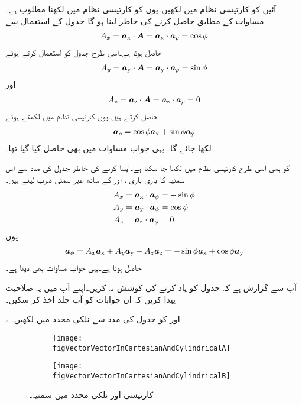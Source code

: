 آئیں  کو کارتیسی نظام میں لکھیں۔یوں  کو  کارتیسی نظام میں لکھنا مطلوب ہے۔مساوات  کے مطابق   حاصل کرنے کی خاطر  لینا ہو گا۔جدول  کے استعمال سے
\begin{align*}
A_x={\boldsymbol{a}}_{\textup{x}} \cdot {\ensuremath{{\boldsymbol{A}}}}={\boldsymbol{a}}_{\textup{x}} \cdot {\boldsymbol{a}}_{\rho}=\cos \phi
\end{align*}
حاصل ہوتا ہے۔اسی طرح جدول کو استعمال کرتے ہوئے
\begin{align*}
A_y={\boldsymbol{a}}_{\textup{y}} \cdot {\ensuremath{{\boldsymbol{A}}}}={\boldsymbol{a}}_{\textup{y}} \cdot {\boldsymbol{a}}_{\rho}=\sin \phi
\end{align*}
اور
\begin{align*}
A_z={\boldsymbol{a}}_{\textup{z}} \cdot {\ensuremath{{\boldsymbol{A}}}}={\boldsymbol{a}}_{\textup{z}} \cdot {\boldsymbol{a}}_{\rho}=0
\end{align*}
حاصل کرتے  ہیں۔یوں کارتیسی نظام میں  لکھتے ہوئے
\begin{align*}
{\boldsymbol{a}}_{\rho} = \cos \phi {\boldsymbol{a}}_{\textup{x}} +\sin \phi {\boldsymbol{a}}_{\textup{y}}
\end{align*}
لکھا جائے گا۔ یہی جواب مساوات  میں بھی حاصل کیا گیا تھا۔

 کو بھی اسی طرح کارتیسی نظام میں لکھا جا سکتا ہے۔ایسا کرنے کی خاطر جدول  کی مدد سے  اس سمتیہ کا باری باری ،  اور  کے ساتھ غیر سمتی ضرب لیتے ہیں۔
\begin{align*}
A_x&={\boldsymbol{a}}_{\textup{x}} \cdot {\boldsymbol{a}}_{\phi}=-\sin \phi\\
A_y&={\boldsymbol{a}}_{\textup{y}} \cdot {\boldsymbol{a}}_{\phi}=\cos \phi\\
A_z&={\boldsymbol{a}}_{\textup{z}} \cdot {\boldsymbol{a}}_{\phi}=0
\end{align*}
یوں
\begin{align*}
{\boldsymbol{a}}_{\phi}=A_x {\boldsymbol{a}}_{\textup{x}}+A_y {\boldsymbol{a}}_{\textup{y}}+A_z {\boldsymbol{a}}_{\textup{z}} = -\sin \phi {\boldsymbol{a}}_{\textup{x}}+\cos \phi {\boldsymbol{a}}_{\textup{y}}
\end{align*}
حاصل ہوتا ہے۔یہی جواب مساوات  بھی دیتا ہے۔

آپ سے گزارش ہے کہ جدول  کو یاد کرنے کی کوشش نہ کریں۔اپنے آپ میں یہ صلاحیت پیدا کریں کہ ان جوابات کو آپ جلد اخذ کر سکیں۔

،  اور  کو جدول  کی مدد سے  نلکی محدد میں لکھیں۔
%
\begin{figure}
\centering
\begin{subfigure}{0.5\textwidth}
\centering
\texttt{[image: figVectorVectorInCartesianAndCylindricalA]}
\end{subfigure}%
%
\begin{subfigure}{0.5\textwidth}
\centering
\texttt{[image: figVectorVectorInCartesianAndCylindricalB]}
\end{subfigure}%
\caption{کارتیسی اور نلکی محدد میں سمتیہ۔}
\label{شکل_سمتیہ_کارتیسی_نلکی_مساوات}
\end{figure}

